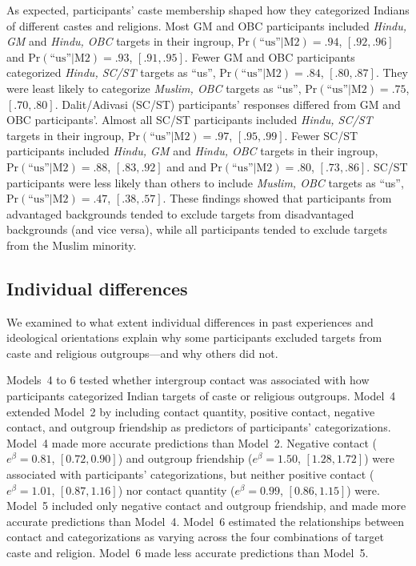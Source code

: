 \documentclass[12pt, a4paper]{article}
\newcommand{\pest}[4]{$ \text{Pr} (\text{``us''} | \text{#1}) = #2$, $[#3, #4]$}
\begin{document}
As expected, participants' caste membership shaped how they categorized Indians of different castes and religions. Most GM and OBC participants included \emph{Hindu, GM} and \emph{Hindu, OBC} targets in their ingroup, \pest{M2}{.94}{.92}{.96} and \pest{M2}{.93}{.91}{.95}. Fewer GM and OBC participants categorized \emph{Hindu, SC/ST} targets as ``us'', \pest{M2}{.84}{.80}{.87}. They were least likely to categorize \emph{Muslim, OBC} targets as ``us'', \pest{M2}{.75}{.70}{.80}. Dalit/Adivasi (SC/ST) participants' responses differed from GM and OBC participants'. Almost all SC/ST participants included \emph{Hindu, SC/ST} targets in their ingroup, \pest{M2}{.97}{.95}{.99}. Fewer SC/ST participants included \emph{Hindu, GM} and \emph{Hindu, OBC} targets in their ingroup, \pest{M2}{.88}{.83}{.92} and  and \pest{M2}{.80}{.73}{.86}. SC/ST participants were less likely than others to include \emph{Muslim, OBC} targets as ``us'', \pest{M2}{.47}{.38}{.57}. These findings showed that participants from advantaged backgrounds tended to exclude targets from disadvantaged backgrounds (and vice versa), while all participants tended to exclude targets from the Muslim minority.

\subsection{Individual differences}

We examined to what extent individual differences in past experiences and ideological orientations explain why some participants excluded targets from caste and religious outgroups---and why others did not.

Models~4 to 6 tested whether intergroup contact was associated with how participants categorized Indian targets of caste or religious outgroups. Model~4 extended Model~2 by including contact quantity, positive contact, negative contact, and outgroup friendship as predictors of participants' categorizations. Model~4 made more accurate predictions than Model~2. Negative contact ($e^\beta = 0.81$, $[0.72, 0.90]$) and outgroup friendship ($e^\beta = 1.50$, $[1.28, 1.72]$) were associated with participants' categorizations, but neither positive contact ($e^\beta = 1.01$, $[0.87, 1.16]$) nor contact quantity ($e^\beta = 0.99$, $[0.86, 1.15]$) were. Model~5 included only negative contact and outgroup friendship, and made more accurate predictions than Model~4. Model~6 estimated the relationships between contact and categorizations as varying across the four combinations of target caste and religion. Model~6 made less accurate predictions than Model~5.
\end{document}
